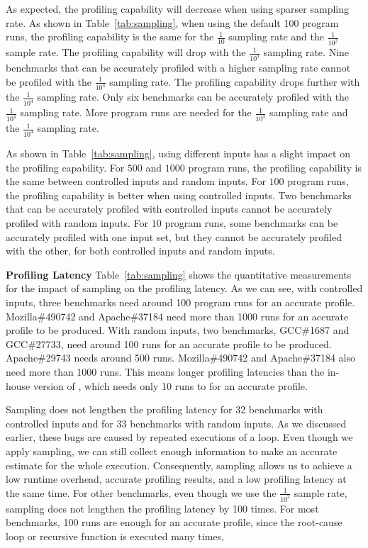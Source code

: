 As expected, the profiling capability will decrease when using sparser sampling rate. 
As shown in Table~\ref{tab:sampling}, 
when using the default 100 program runs,
the profiling capability is the same for the $\frac{1}{10}$ sampling rate 
and the $\frac{1}{10^2}$ sample rate.
The profiling capability will drop with the $\frac{1}{10^3}$ sampling rate. 
Nine benchmarks that can be accurately profiled with a higher sampling rate
cannot be profiled with the $\frac{1}{10^3}$ sampling rate.
The profiling capability drops further with the $\frac{1}{10^4}$ sampling rate. 
Only six benchmarks can be accurately profiled with the $\frac{1}{10^4}$ sampling rate. 
More program runs are needed for the $\frac{1}{10^3}$ sampling rate 
and the $\frac{1}{10^4}$ sampling rate. 

As shown in Table~\ref{tab:sampling}, 
using different inputs has a slight impact on the profiling capability. 
For $500$ and $1000$ program runs, 
the profiling capability is the same between controlled inputs and random inputs. 
For $100$ program runs, 
the profiling capability is better when using controlled inputs.
Two benchmarks that can be accurately profiled with controlled inputs 
cannot be accurately profiled with random inputs.
For $10$ program runs, 
some benchmarks can be accurately 
profiled with one input set, but they cannot 
be accurately profiled with the other, 
for both controlled inputs and random inputs.

\noindent\textbf{Profiling Latency}
Table~\ref{tab:sampling} shows the quantitative measurements for the impact of sampling on the profiling latency.
As we can see, with controlled inputs, 
three benchmarks need around 100 program runs for an accurate profile. 
Mozilla\#490742 and Apache\#37184 need more than 1000 runs for an accurate profile to be produced. 
With random inputs, two benchmarks, GCC\#1687 and GCC\#27733, 
need around 100 runs for an accurate profile to be produced. 
Apache\#29743 needs around 500 runs. 
Mozilla\#490742 and Apache\#37184 also need more than 1000 runs.   
This means longer profiling latencies than the in-house version of \Tool,
which needs only 10 runs to for an accurate profile. 

Sampling does not lengthen the profiling latency for 32 benchmarks 
with controlled 
inputs and for 33 benchmarks with random inputs.
As we discussed earlier, these bugs are caused by repeated executions of a loop. 
Even though we apply sampling, 
we can still collect enough information to make an accurate estimate for the whole execution. 
Consequently, sampling allows us to achieve a low runtime overhead, 
accurate profiling results, and a low profiling latency at the same time. 
For other benchmarks, even though we use the $\frac{1}{10^2}$ sample rate, 
sampling does not lengthen the profiling latency by 100 times. 
For most benchmarks, 100 runs are enough for an accurate profile, 
since the root-cause loop or recursive function is executed many times, 


















